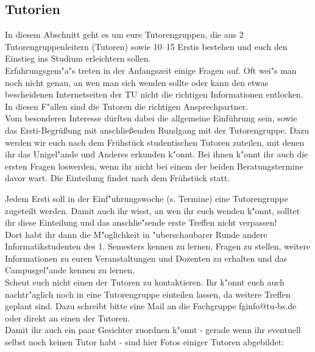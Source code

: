 \subsection{Tutorien}


In diesem Abschnitt geht es um eure Tutorengruppen, die aus 2 Tutorengruppenleitern (Tutoren) sowie 10--15 Erstis bestehen und euch den Einstieg ins Studium erleichtern sollen.\\
Erfahrungsgem"a"s treten in der Anfangszeit einige Fragen auf. Oft wei"s man noch nicht genau, an wen man sich wenden sollte oder kann den etwas bescheidenen Internetseiten der TU nicht die richtigen Informationen entlocken. In diesen F"allen sind die Tutoren die richtigen Ansprechpartner.\\

Vom besonderen Interesse dürften dabei die allgemeine Einführung sein,
sowie das Ersti-Begrüßung mit anschließenden Rundgang mit der
Tutorengruppe.
Dazu werden wir euch nach dem Frühstück studentischen 
Tutoren zuteilen, mit denen ihr das Unigel"ande und Anderes erkunden 
k"onnt. Bei ihnen k"onnt ihr auch die ersten Fragen loswerden, wenn 
ihr nicht bei einem der beiden Beratungstermine davor wart.
Die Einteilung findet nach dem Frühstück statt.

Jedem Ersti soll in der Einf"uhrungswoche (s. Termine) eine Tutorengruppe zugeteilt werden. Damit auch ihr wisst, an wen ihr euch wenden k"onnt, solltet ihr diese Einteilung und das anschlie"sende erste Treffen nicht verpassen!\\
Dort habt ihr dann die M"oglichkeit in "uberschaubarer Runde andere Informatikstudenten des 1. Semesters kennen zu lernen, Fragen zu stellen, weitere Informationen zu euren Veranstaltungen und Dozenten zu erhalten und das Campusgel"ande kennen zu lernen.\\
Scheut euch nicht einen der Tutoren zu kontaktieren. Ihr k"onnt euch auch nachtr"aglich noch in eine Tutorengruppe einteilen lassen, da weitere Treffen geplant sind. Dazu schreibt bitte eine Mail an die Fachgruppe fginfo@tu-bs.de oder direkt an einen der Tutoren.\\
Damit ihr auch ein paar Gesichter zuordnen k"onnt - gerade wenn ihr eventuell selbst noch keinen Tutor habt - sind hier Fotos einiger Tutoren abgebildet:

